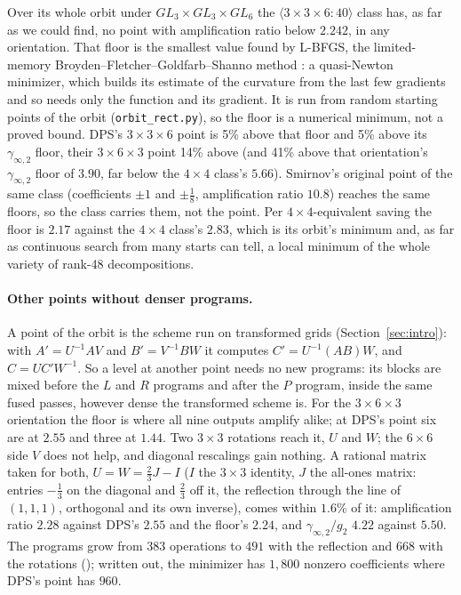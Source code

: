 \documentclass[11pt]{article}
\newcommand{\mm}[1]{\langle #1\rangle}
\newcommand{\ginf}{\gamma_{\infty,2}}
\begin{document}
Over its whole orbit under $GL_3\times GL_3\times GL_6$ the
$\mm{3\times3\times6:40}$ class has, as far as we could find, no point with
amplification ratio below $2.242$, in any orientation.  That floor is the smallest value found by L-BFGS, the
limited-memory Broyden--Fletcher--Goldfarb--Shanno method \cite{LN89}: a
quasi-Newton minimizer, which builds its estimate of the curvature from the
last few gradients and so needs only the function and its gradient.  It is run
from random starting points of the orbit (\texttt{orbit\_rect.py}), so the
floor is a numerical minimum, not a proved bound.  DPS's
$3\times3\times6$ point is 5\% above that floor and 5\% above its $\ginf$
floor, their $3\times6\times3$ point 14\% above (and 41\% above that
orientation's $\ginf$ floor of $3.90$, far below the $4\times4$ class's
$5.66$).  Smirnov's original point of the same class (coefficients $\pm1$
and $\pm\tfrac18$, amplification ratio $10.8$) reaches the same floors, so the class carries them, not the point.
Per $4\times4$-equivalent saving the floor is $2.17$ against the $4\times4$
class's $2.83$, which is its orbit's minimum and, as far as continuous search
from many starts can tell, a local minimum of the whole variety of rank-48
decompositions.

\paragraph{Other points without denser programs.}\label{par:mixed}
A point of the orbit is the scheme run on transformed grids
(Section~\ref{sec:intro}): with $A'=U^{-1}AV$ and $B'=V^{-1}BW$ it computes
$C'=U^{-1}(AB)W$, and $C=UC'W^{-1}$.  So a level at another point needs no
new programs: its blocks are mixed before the $L$ and $R$ programs and after
the $P$ program, inside the same fused passes, however dense the transformed
scheme is.  For the $3\times6\times3$ orientation the floor is where all nine
outputs amplify alike; at DPS's point six are at $2.55$ and three at $1.44$.
Two $3\times3$ rotations reach it, $U$ and $W$; the $6\times6$ side $V$ does
not help, and diagonal rescalings gain nothing.  A rational matrix taken for
both, $U=W=\tfrac23J-I$ ($I$ the $3\times3$ identity, $J$ the all-ones
matrix: entries $-\tfrac13$ on the diagonal and $\tfrac23$ off it, the
reflection through the line of $(1,1,1)$, orthogonal and its own inverse),
comes within $1.6\%$ of
it: amplification ratio $2.28$ against DPS's $2.55$ and the floor's $2.24$,
and $\ginf/g_2$ $4.22$ against $5.50$.  The programs grow from $383$
operations to $491$ with the reflection and $668$ with the rotations
(); written out, the minimizer has $1{,}800$ nonzero
coefficients where DPS's point has $960$.
\end{document}
